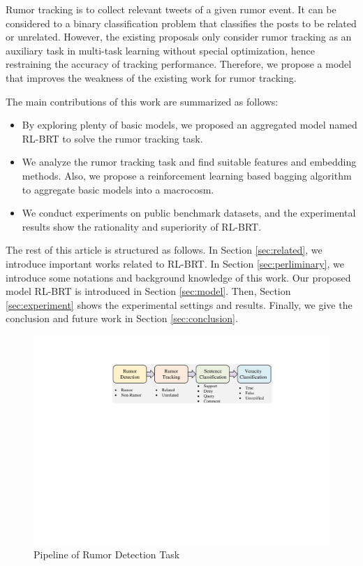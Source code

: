 Rumor tracking is to collect relevant tweets of a given rumor event. It can be considered to a binary classification problem that classifies the posts to be related or unrelated. However, the existing proposals \cite{DBLP:conf/emnlp/QazvinianRRM11, DBLP:conf/www/ChengNB20}  only consider rumor tracking as an auxiliary task in multi-task learning without special optimization, hence restraining the accuracy of tracking performance.
Therefore, we propose a model that improves the weakness of the existing work for rumor tracking.

The main contributions of this work are summarized as follows:
\begin{itemize}
	\item By exploring plenty of basic models, we proposed an aggregated model named RL-BRT to solve the rumor tracking task. 
	\item We analyze the rumor tracking task and find suitable features and embedding methods. Also, we propose a reinforcement learning based bagging algorithm to aggregate basic models into a macrocosm.
	\item We conduct experiments on public benchmark datasets, and the experimental results show the rationality and superiority of RL-BRT.
\end{itemize}

The rest of this article is structured as follows. In Section \ref{sec:related}, we introduce important works related to RL-BRT. In Section \ref{sec:perliminary}, we introduce some notations and background knowledge of this work. Our proposed model RL-BRT is introduced in Section \ref{sec:model}. Then, Section \ref{sec:experiment} shows the experimental settings and results. Finally, we give the conclusion and future work in Section \ref{sec:conclusion}.

\begin{figure}[tbp]
	\hspace{0ex}
	\vspace{0ex}
	\centering
	\includegraphics[width = \textwidth]{fig/pipeline}
	\caption{Pipeline of Rumor Detection Task}
	\label{fig:pipeline}
\end{figure}